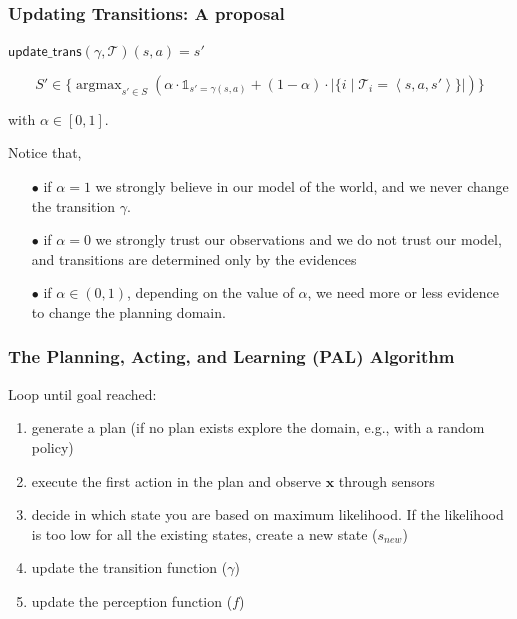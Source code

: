 \documentclass{beamer}
\DeclareMathOperator*{\argmax}{argmax}
\def\updgamma{\mathsf{update\_trans}}
\def\bx{\pmb{x}}
\def\T{\mathcal{T}}
\begin{document}
\begin{frame} 
  \frametitle{Updating Transitions: A proposal} 

  $\updgamma(\gamma,\T)(s,a)=s'$

$$
S' \in \{\argmax_{s'\in S}\left(\alpha\cdot\mathbb{1}_{s'=\gamma(s,a)}+
    (1-\alpha)\cdot|\{i\mid \T_i=\left<s,a,s'\right>\}|
\right)\}
$$

with $\alpha\in[0,1]$.

\pause
\vspace{1cm}
Notice that,
\begin{itemize}
\item[$\bullet$] 
if {\color {red} $\alpha = 1$} we strongly believe in our
model of the world, and we never change the transition $\gamma$.
\pause
\item[$\bullet$] 
if {\color {red} $\alpha = 0$} we strongly trust our observations and
we do not trust our model, and transitions are determined only by the evidences 
\pause
\item[$\bullet$] 
if {\color {red} $\alpha \in (0,1)$}, depending on the value of
$\alpha$, we need more or less evidence to change the planning
domain.
\end{itemize}
\end{frame}

\begin{frame}
\frametitle{The Planning, Acting, and Learning (PAL) Algorithm}
Loop until goal reached: 
\begin{enumerate}
\item generate a plan (if no plan exists explore the domain, e.g., with a random policy) 
\item execute the first action in the plan and observe $\bx$ through sensors
\item decide in which state you are based on maximum likelihood. If the likelihood  is too low for all the existing states, create a new state ($s_{new}$)
\item update the transition function ($\gamma$) 
\item \alert<2>{update the perception function ($f$)}
\end{enumerate}
\end{frame}
\end{document}

